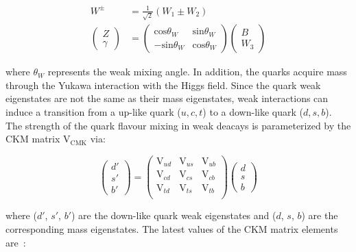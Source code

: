 \begin{equation}
  \begin{split}
    W^{\pm} & = \frac{1}{\sqrt{2}}\left(W_{1} \pm W_{2}\right) \\
    \begin{pmatrix} Z \\ \gamma \end{pmatrix} & = \begin{pmatrix} \mathrm{cos}{\theta_{W}} & \mathrm{sin}{\theta_{W}} \\ -\mathrm{sin}{\theta_{W}} & \mathrm{cos}{\theta_{W}} \end{pmatrix} \begin{pmatrix} B \\ W_{3} \end{pmatrix}
  \end{split}
  \label{eq:ElectroWeakBosons}
\end{equation}

where $\theta_{W}$ represents the weak mixing angle. In addition, the quarks acquire mass through the Yukawa interaction with the Higgs field. Since the quark weak eigenstates are not the same as their mass eigenstates, weak interactions can induce a transition from a up-like quark ($u, c, t$) to a down-like quark ($d, s, b$). The strength of the quark flavour mixing in weak deacays is parameterized by the CKM matrix $\mathrm{V}_\mathrm{CMK}$ via:

\begin{equation}
\begin{pmatrix} d' \\ s' \\ b' \end{pmatrix} = \begin{pmatrix} \mathrm{V}_{ud} & \mathrm{V}_{us} & \mathrm{V}_{ub} \\ \mathrm{V}_{cd} & \mathrm{V}_{cs} & \mathrm{V}_{cb} \\ \mathrm{V}_{td} & \mathrm{V}_{ts} & \mathrm{V}_{tb} \\ \end{pmatrix}\begin{pmatrix} d \\ s \\ b \end{pmatrix}
\end{equation}

where ($d'$, $s'$, $b'$) are the down-like quark weak eigenstates and ($d$, $s$, $b$) are the corresponding mass eigenstates. The latest values of the CKM matrix elements are~\cite{PDG}:

